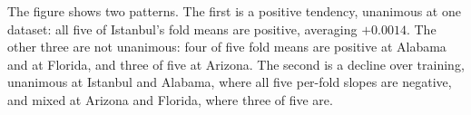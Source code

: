 The figure shows two patterns.
The first is a positive tendency, unanimous at one dataset: all five of Istanbul's fold means are
positive, averaging $+0.0014$. The other three are not unanimous: four of five fold means are
positive at Alabama and at Florida, and three of five at Arizona. The second is a decline over
training, unanimous at Istanbul and Alabama, where all five per-fold slopes are negative, and mixed
at Arizona and Florida, where three of five are.

